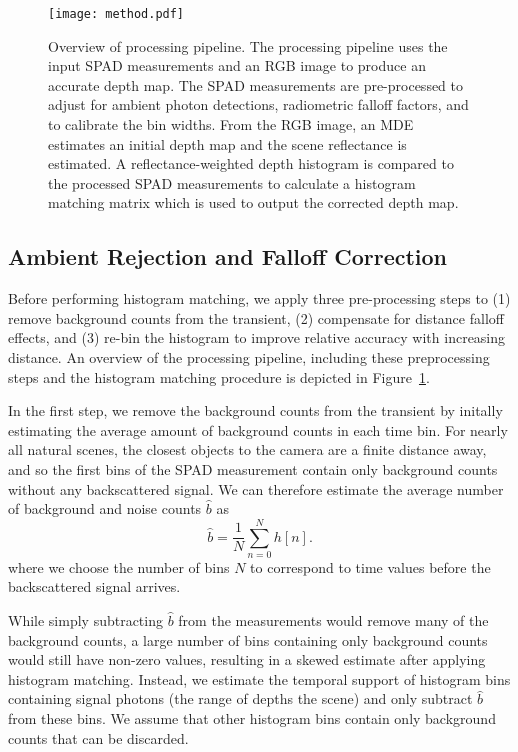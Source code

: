 \begin{figure}
  \centering
  \texttt{[image: method.pdf]}
  \caption{Overview of processing pipeline. The processing pipeline uses
      the input SPAD measurements and an RGB image to produce an accurate depth
      map. The SPAD measurements are pre-processed to adjust for ambient photon
      detections, radiometric falloff factors, and to calibrate the bin widths.
      From the RGB image, an MDE estimates an initial depth map
      and the scene reflectance is estimated. A reflectance-weighted
      depth histogram is compared to the processed SPAD measurements to
      calculate a histogram matching matrix which is used to output the corrected depth map.
  }
  \label{fig:pipeline}
\end{figure}

\subsection{Ambient Rejection and Falloff Correction} Before performing
histogram matching, we apply three pre-processing steps to (1)
remove background counts from the transient, (2) compensate for distance
falloff effects, and (3) re-bin the histogram to improve relative accuracy
with increasing distance. An overview of the processing pipeline, including
these preprocessing steps and the histogram matching procedure is depicted in
Figure~\ref{fig:pipeline}.

In the first step, we remove the background counts from the
transient by initally estimating the average amount of background counts
in each time bin. For nearly all natural scenes, the closest objects to the
camera are a finite distance away, and so the first bins of the SPAD
measurement contain only background counts without any backscattered
signal. We can therefore estimate the
average number of background and noise counts $\hat{b}$ as 
%
\begin{equation}
  \hat b = \frac{1}{N}\sum_{n=0}^N h[n]. 
  \label{eq:ambient_estimate}
\end{equation}
%
where we choose the number of bins $N$ to correspond to time
values before the backscattered signal arrives. 

While simply subtracting $\hat{b}$ from the measurements would remove many of
the background counts, a large number of bins containing only background counts would still
have non-zero values, resulting in a skewed
estimate after applying histogram matching.  Instead, we estimate the temporal
support of histogram bins containing signal photons (\ie the range of depths the
scene) and only subtract $\hat{b}$ from these bins. We assume that other
histogram bins contain only background counts that can be discarded. 

